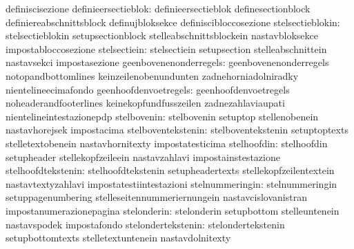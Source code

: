                                  definiscisezione
             definieersectieblok: definieersectieblok              definesectionblock
                                  definiereabschnittsblock         definujbloksekce
                                  definiscibloccosezione
                stelsectieblokin: stelsectieblokin                 setupsectionblock
                                  stelleabschnittsblockein         nastavbloksekce
                                  impostabloccosezione
                    stelsectiein: stelsectiein                     setupsection
                                  stelleabschnittein               nastavsekci
                                  impostasezione
          geenbovenenonderregels: geenbovenenonderregels           notopandbottomlines
                                  keinzeilenobenundunten           zadnehorniadolniradky
                                  nientelineecimafondo
           geenhoofdenvoetregels: geenhoofdenvoetregels            noheaderandfooterlines
                                  keinekopfundfusszeilen           zadnezahlaviaupati
                                  nientelineintestazionepdp
                     stelbovenin: stelbovenin                      setuptop
                                  stellenobenein                   nastavhorejsek
                                  impostacima
              stelboventekstenin: stelboventekstenin               setuptoptexts
                                  stelletextobenein                nastavhornitexty
                                  impostatesticima
                     stelhoofdin: stelhoofdin                      setupheader
                                  stellekopfzeileein               nastavzahlavi
                                  impostainstestazione
              stelhoofdtekstenin: stelhoofdtekstenin               setupheadertexts
                                  stellekopfzeilentextein          nastavtextyzahlavi
                                  impostatestiintestazioni
                 stelnummeringin: stelnummeringin                  setuppagenumbering
                                  stelleseitennummeriernungein     nastavcislovanistran
                                  impostanumerazionepagina
                     stelonderin: stelonderin                      setupbottom
                                  stelleuntenein                   nastavspodek
                                  impostafondo
              stelondertekstenin: stelondertekstenin               setupbottomtexts
                                  stelletextuntenein               nastavdolnitexty
